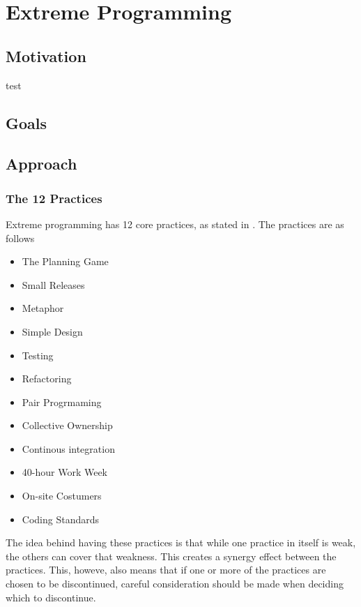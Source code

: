 \section{Extreme Programming}
\subsection{Motivation}
test
\subsection{Goals}
\subsection{Approach}
\subsubsection{The 12 Practices}
Extreme programming has 12 core practices, as stated in \citep{xp:explained}. The practices are as follows

\begin{itemize}
\item The Planning Game
\item Small Releases
\item Metaphor
\item Simple Design
\item Testing
\item Refactoring
\item Pair Progrmaming
\item Collective Ownership
\item Continous integration
\item 40-hour Work Week
\item On-site Costumers
\item Coding Standards
\end{itemize}

The idea behind having these practices is that while one practice in itself is weak, the others can cover that weakness. This creates a synergy effect between the practices. This, howeve, also means that if one or more of the practices are chosen to be discontinued, careful consideration should be made when deciding which to discontinue.


